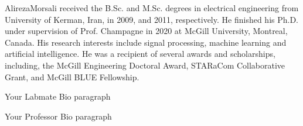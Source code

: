 % 
\vspace{-0.5 cm}



\begin{IEEEbiography}{AlirezaMorsali}
received the B.Sc. and M.Sc. degrees in electrical engineering from University of Kerman, Iran, in 2009, and 2011, respectively. He finished his Ph.D. under supervision of Prof. Champagne in 2020 at McGill University, Montreal, Canada. His research interests include signal processing, machine learning and artificial intelligence. He was a recipient of several awards and scholarships, including, the McGill
Engineering Doctoral Award, STARaCom Collaborative Grant, and McGill BLUE Fellowship.
\vspace{-0.8 cm}
\end{IEEEbiography}


\begin{IEEEbiographynophoto}{Your Labmate}
Bio paragraph
\end{IEEEbiographynophoto}

\begin{IEEEbiographynophoto}{Your Professor}
Bio paragraph
\end{IEEEbiographynophoto}

